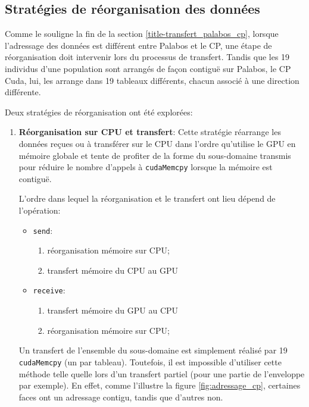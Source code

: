\subsection{Stratégies de réorganisation des données}\label{title-strategie_reorganisation}
Comme le souligne la fin de la section \ref{title-transfert_palabos_cp}, lorsque l'adressage des données est différent entre Palabos et le \ac{CP}, une étape de réorganisation doit intervenir lors du processus de transfert. 
Tandis que les 19 individus d'une population sont arrangés de façon contiguë sur Palabos, le \ac{CP} Cuda, lui, les arrange dans 19 tableaux différents, chacun associé à une direction différente.

Deux stratégies de réorganisation ont été explorées:
\begin{enumerate}
\item \textbf{Réorganisation sur \ac{CPU} et transfert}: Cette stratégie réarrange les données reçues ou à transférer sur le \acs{CPU} dans l'ordre qu'utilise le \acs{GPU} en mémoire globale et tente de profiter de la forme du sous-domaine transmis pour réduire le nombre d'appels à \texttt{cudaMemcpy} lorsque la mémoire est contiguë.

L'ordre dans lequel la réorganisation et le transfert ont lieu dépend de l'opération:
\begin{itemize}
\item \texttt{send}:
\begin{enumerate}
\item réorganisation mémoire sur \acs{CPU};
\item transfert mémoire du \acs{CPU} au \acs{GPU}
\end{enumerate}
\item \texttt{receive}:
\begin{enumerate}
	\item transfert mémoire du \acs{GPU} au \acs{CPU}
	\item réorganisation mémoire sur \acs{CPU};
\end{enumerate}
\end{itemize}

Un transfert de l'ensemble du sous-domaine est simplement réalisé par 19 \texttt{cudaMemcpy} (un par tableau). Toutefois, il est impossible d'utiliser cette méthode telle quelle lors d'un transfert partiel (pour une partie de l'enveloppe par exemple). En effet, comme l'illustre la figure \ref{fig:adressage_cp}, certaines faces ont un adressage contigu, tandis que d'autres non.


\end{enumerate}
